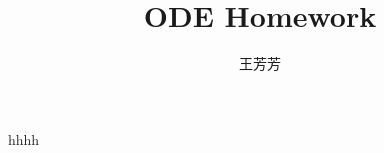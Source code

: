 \documentclass[UTF8]{ctexart}
\title{ODE Homework}
\date{}
\author{王芳芳}
\begin{document}
\maketitle
hhhh
\end{document}
